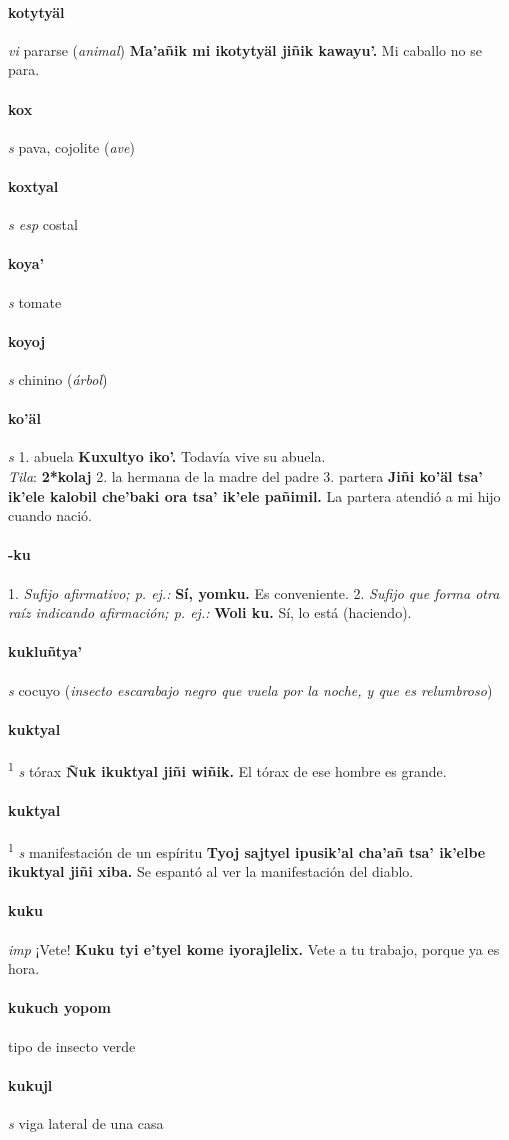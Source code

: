 \documentclass{scrbook}
\newcommand{\entry}[1]{\paragraph{#1}}
\newcommand{\onedefinition}[1]{#1.}
\newcommand{\defsuperscript}[1]{\textsuperscript{1}}
\newcommand{\nontranslationdef}[1]{\textit{#1}}
\newcommand{\partofspeech}[1]{\textit{#1}}
\newcommand{\spanishtranslation}[1]{#1}
\newcommand{\clarification}[1]{(\textit{#1})}
\newcommand{\cholexample}[1]{\textbf{#1}}
\newcommand{\exampletranslation}[1]{#1}
\newcommand{\dialectvariant}[1]{\\\textit{#1}:}
\newcommand{\dialectword}[1]{\textbf{#1}}
\begin{document}
\begin{multicols}{2}
\entry{kotytyäl}
\partofspeech{vi}
\spanishtranslation{pararse}
\clarification{animal}
\cholexample{Ma'añik mi ikotytyäl jiñik kawayu'.}
\exampletranslation{Mi caballo no se para.}

\entry{kox}
\partofspeech{s}
\spanishtranslation{pava, cojolite}
\clarification{ave}

\entry{koxtyal}
\partofspeech{s esp}
\spanishtranslation{costal}

\entry{koya'}
\partofspeech{s}
\spanishtranslation{tomate}

\entry{koyoj}
\partofspeech{s}
\spanishtranslation{chinino}
\clarification{árbol}

\entry{ko'äl}
\partofspeech{s}
\onedefinition{1}
\spanishtranslation{abuela}
\cholexample{Kuxultyo iko'.}
\exampletranslation{Todavía vive su abuela.}
\dialectvariant{Tila}
\dialectword{2*kolaj}
\onedefinition{2}
\spanishtranslation{la hermana de la madre del padre}
\onedefinition{3}
\spanishtranslation{partera}
\cholexample{Jiñi ko'äl tsa' ik'ele kalobil che'baki ora tsa' ik'ele pañimil.}
\exampletranslation{La partera atendió a mi hijo cuando nació.}

\entry{-ku}
\onedefinition{1}
\nontranslationdef{Sufijo afirmativo; p. ej.:}
\cholexample{Sí, yomku.}
\exampletranslation{Es conveniente.}
\onedefinition{2}
\nontranslationdef{Sufijo que forma otra raíz indicando afirmación; p. ej.:}
\cholexample{Woli ku.}
\exampletranslation{Sí, lo está (haciendo).}

\entry{kukluñtya'}
\partofspeech{s}
\spanishtranslation{cocuyo}
\clarification{insecto escarabajo negro que vuela por la noche, y que es relumbroso}

\entry{kuktyal}
\defsuperscript{1}
\partofspeech{s}
\spanishtranslation{tórax}
\cholexample{Ñuk ikuktyal jiñi wiñik.}
\exampletranslation{El tórax de ese hombre es grande.}

\entry{kuktyal}
\defsuperscript{2}
\partofspeech{s}
\spanishtranslation{manifestación de un espíritu}
\cholexample{Tyoj sajtyel ipusik'al cha'añ tsa' ik'elbe ikuktyal jiñi xiba.}
\exampletranslation{Se espantó al ver la manifestación del diablo.}

\entry{kuku}
\partofspeech{imp}
\spanishtranslation{¡Vete!}
\cholexample{Kuku tyi e'tyel kome iyorajlelix.}
\exampletranslation{Vete a tu trabajo, porque ya es hora.}

\entry{kukuch yopom}
\spanishtranslation{tipo de insecto verde}

\entry{kukujl}
\partofspeech{s}
\spanishtranslation{viga lateral de una casa}


\end{multicols}
\end{document}
